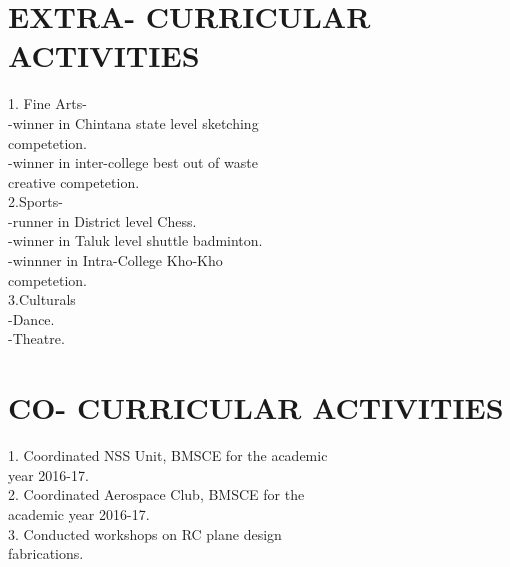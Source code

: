 \documentclass[10pt]{article}
\begin{document}
\raggedright
\section*{\large{EXTRA- \hspace{8in}CURRICULAR \hspace{8in}ACTIVITIES}}
\hspace{2in} \large{ 1. Fine Arts- }\\
\hspace{2.5in} \large{ -winner in Chintana state level sketching\\ \hspace{2.65in}  competetion. }\\
\hspace{2.5in} \large{ -winner in inter-college best out of waste\\ \hspace{2.65in} creative competetion.}\\
\hspace{2in} \large{ 2.Sports-  }\\
\hspace{2.5in} \large{ -runner in District level Chess. }\\
\hspace{2.5in} \large{ -winner in Taluk level shuttle badminton. }\\
\hspace{2.5in} \large{ -winnner in Intra-College Kho-Kho\\ \hspace{2.65in}competetion. }\\
\hspace{2in} \large{ 3.Culturals }\\
\hspace{2.5in} \large{ -Dance.}\\
\hspace{2.5in} \large{ -Theatre.}\\

\raggedright
\section*{\large{CO- \hspace{8in}CURRICULAR \hspace{8in}ACTIVITIES}}
\hspace{2in} \large{ 1. Coordinated NSS Unit, BMSCE for the academic\\ \hspace{2.3in} year 2016-17.}\\
\hspace{2in} \large{ 2. Coordinated Aerospace Club, BMSCE for the \\ \hspace{2.3in}academic year 2016-17. }\\
\hspace{2in} \large{ 3. Conducted workshops on RC plane design \\ \hspace{2.3in}fabrications. }\\
\end{document}
